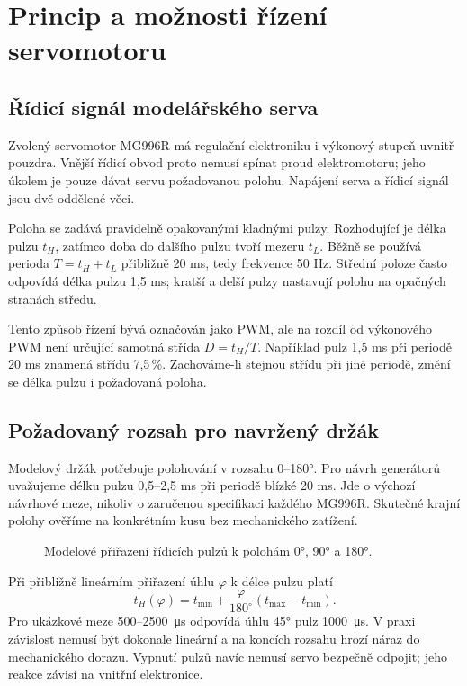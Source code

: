 \chapter{Princip a možnosti řízení servomotoru}
\label{chap:rizeni}

\section{Řídicí signál modelářského serva}

Zvolený servomotor MG996R má regulační elektroniku i výkonový stupeň uvnitř pouzdra. Vnější řídicí obvod proto nemusí spínat proud elektromotoru; jeho úkolem je pouze dávat servu požadovanou polohu. Napájení serva a řídicí signál jsou dvě oddělené věci.

Poloha se zadává pravidelně opakovanými kladnými pulzy. Rozhodující je délka pulzu $t_H$, zatímco doba do dalšího pulzu tvoří mezeru $t_L$. Běžně se používá perioda $T=t_H+t_L$ přibližně 20 ms, tedy frekvence 50 Hz. Střední poloze často odpovídá délka pulzu 1,5 ms; kratší a delší pulzy nastavují polohu na opačných stranách středu.~\cite{pololu}

Tento způsob řízení bývá označován jako PWM, ale na rozdíl od výkonového PWM není určující samotná střída $D=t_H/T$. Například pulz 1,5 ms při periodě 20 ms znamená střídu 7,5\,\%. Zachováme-li stejnou střídu při jiné periodě, změní se délka pulzu i požadovaná poloha.

\section{Požadovaný rozsah pro navržený držák}

Modelový držák potřebuje polohování v rozsahu 0--180°. Pro návrh generátorů uvažujeme délku pulzu 0,5--2,5 ms při periodě blízké 20 ms. Jde o výchozí návrhové meze, nikoliv o zaručenou specifikaci každého MG996R. Skutečné krajní polohy ověříme na konkrétním kusu bez mechanického zatížení.

\begin{figure}[htbp]\centering

\caption{Modelové přiřazení řídicích pulzů k polohám 0°, 90° a 180°.}
\label{fig:pulzy}
\end{figure}

Při přibližně lineárním přiřazení úhlu $\varphi$ k délce pulzu platí
\begin{equation}\label{eq:map}
 t_H(\varphi)=t_\mathrm{min}+\frac{\varphi}{180^\circ}(t_\mathrm{max}-t_\mathrm{min}).
\end{equation}
Pro ukázkové meze 500--2500~\si{\micro\second} odpovídá úhlu 45° pulz 1000~\si{\micro\second}. V praxi závislost nemusí být dokonale lineární a na koncích rozsahu hrozí náraz do mechanického dorazu. Vypnutí pulzů navíc nemusí servo bezpečně odpojit; jeho reakce závisí na vnitřní elektronice.

